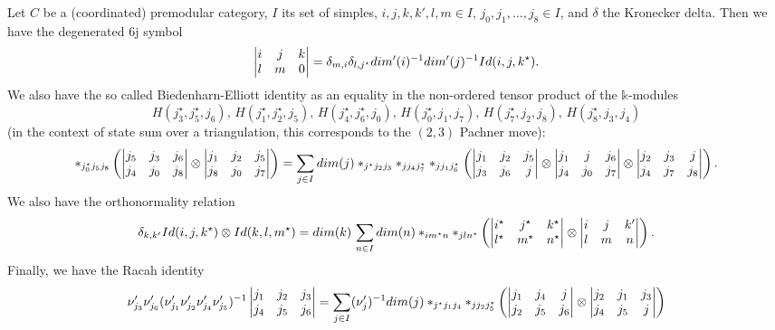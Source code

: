 \begin{proposition}\label{prop/basic-equalities-of-6j-symbols}
  Let $C$ be a (coordinated) premodular category, $I$ its set of
  simples, $i, j, k, k', l, m \in I$,
  $j_{0}, j_{1}, \ldots, j_{8} \in I$, and $\delta$ the Kronecker
  delta. Then we have the degenerated $6$j symbol
  \begin{equation}\label{eqn/degenerated-6j}
    \begin{vmatrix} i & j & k \\ l & m & 0 \\ \end{vmatrix} = \delta_{m,i} \delta_{l,j^{\star}}dim'(i)^{-1}dim'(j)^{-1}Id(i,j,k^{\star}).
  \end{equation}
  We also have the so called Biedenharn-Elliott identity as an equality in the non-ordered tensor product of the $\mathbb{k}$-modules
  $$
  H(j_{3}^{\star}, j_{5}^{\star}, j_{6}),\,
  H(j_{1}^{\star}, j_{2}^{\star}, j_{5}),\,
  H(j_{4}^{\star}, j_{6}^{\star}, j_{0}),\,
  H(j_{0}^{\star}, j_{1}, j_{7}),\,
  H(j_{7}^{\star}, j_{2}, j_{8}),\,
  H(j_{8}^{\star}, j_{3}, j_{4})
  $$
  (in the context of state sum over a triangulation, this corresponds to the $(2,3)$ Pachner move):
  \begin{equation}\label{eqn/Biedenharn-Elliot-identity}
    \ast_{j_{0}^{\star}j_{5}j_{8}}
    \left(
      \begin{vmatrix} j_{5} & j_{3} & j_{6} \\ j_{4} & j_{0} & j_{8} \\ \end{vmatrix} \otimes \begin{vmatrix} j_{1} & j_{2} & j_{5} \\ j_{8} & j_{0} & j_{7} \\ \end{vmatrix}
    \right)
    =
    \sum_{j \in I} dim(j)
    \ast_{j^{\star}j_{2}j_{3}}\ast_{jj_{4}j_{7}^{\star}}\ast_{jj_{1}j_{6}^{\star}}
    \left(
      \begin{vmatrix} j_{1} & j_{2} & j_{5} \\ j_{3} & j_{6} & j \\ \end{vmatrix} \otimes
      \begin{vmatrix} j_{1} & j & j_{6} \\ j_{4} & j_{0} & j_{7} \\ \end{vmatrix} \otimes
      \begin{vmatrix} j_{2} & j_{3} & j \\ j_{4} & j_{7} & j_{8} \\ \end{vmatrix}
    \right).
  \end{equation}
  We also have the orthonormality relation
  \begin{equation}\label{eqn/orthonormality-relation}
    \delta_{k,k'} Id(i,j,k^{\star}) \otimes Id(k,l,m^{\star})
    =
    dim(k)\,\sum_{n \in I} dim(n) \ast_{im^{\star}n} \ast_{jln^{\star}}
    \left(
      \begin{vmatrix} i^{\star} & j^{\star} & k^{\star} \\ l^{\star} & m^{\star} & n^{\star} \\ \end{vmatrix} \otimes
      \begin{vmatrix} i & j & k' \\ l & m & n \\ \end{vmatrix}
    \right).
  \end{equation}
  Finally, we have the Racah identity
  \begin{equation}\label{eqn/Racah-identity}
    \nu'_{j_{3}} \nu'_{j_{6}} (\nu'_{j_{1}} \nu'_{j_{2}} \nu'_{j_{4}} \nu'_{j_{5}})^{-1}
    \begin{vmatrix} j_{1} & j_{2} & j_{3} \\ j_{4} & j_{5} & j_{6} \\ \end{vmatrix}
    =
    \sum_{j \in I} (\nu'_{j})^{-1} dim(j) \ast_{j^{\star}j_{1}j_{4}} \ast_{jj_{2}j_{5}^{\star}}
    \left(
      \begin{vmatrix} j_{1} & j_{4} & j \\ j_{2} & j_{5} & j_{6} \\ \end{vmatrix} \otimes
      \begin{vmatrix} j_{2} & j_{1} & j_{3} \\ j_{4} & j_{5} & j \\ \end{vmatrix}
    \right)
  \end{equation}
\end{proposition}

